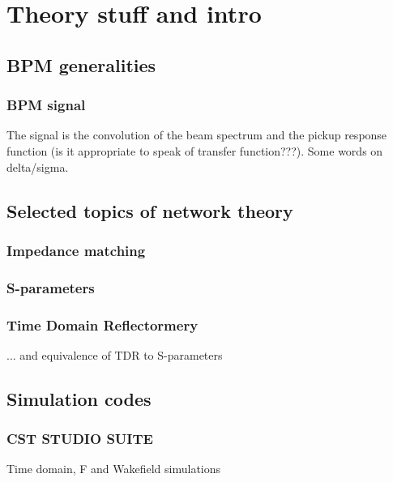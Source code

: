 \chapter{Theory stuff and intro}

\section[BPM generalities]{BPM generalities}

\subsection[BPM signal]{BPM signal}

The signal is the convolution of the beam spectrum and the pickup response function (is it appropriate to speak of transfer function???). Some words on delta/sigma.


\section[Selected topics of network theory]{Selected topics of network theory}

\subsection[Impedance matching]{Impedance matching}

\subsection[S-parameters]{S-parameters}

\subsection[Time Domain Reflectormery]{Time Domain Reflectormery}

... and equivalence of TDR to S-parameters

\section[Simulation codes]{Simulation codes}

\subsection[CST STUDIO SUITE\textregistered]{CST STUDIO SUITE\textregistered}

Time domain, F and Wakefield simulations

